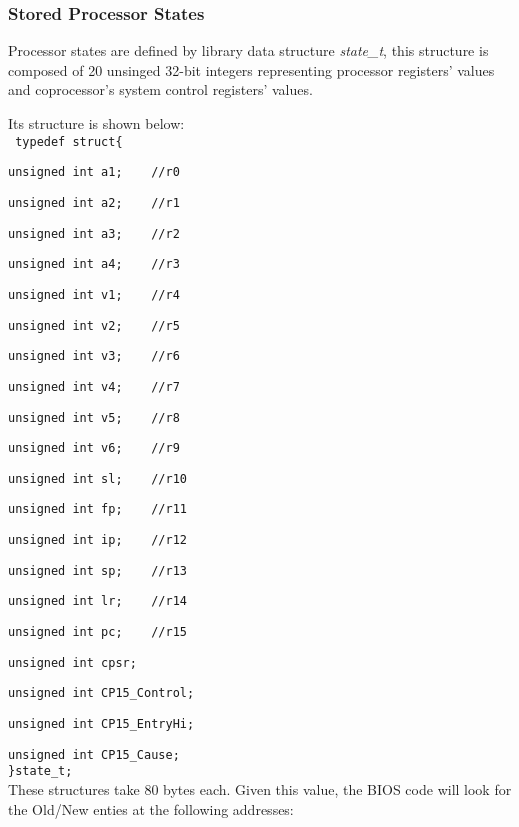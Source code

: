 \subsubsection{Stored Processor States}
Processor states are defined by library data structure \emph{state\_t}, this structure is composed of 20 unsinged 32-bit integers representing processor registers' values and coprocessor's system control registers' values. 

Its structure is shown below:
\nopagebreak
\\
\texttt{ typedef struct\{}

\nopagebreak
\texttt{unsigned int a1;\ \ \ \ //r0}

\nopagebreak
\texttt{unsigned int a2;\ \ \ \ //r1}

\nopagebreak
\texttt{unsigned int a3;\ \ \ \ //r2}

\nopagebreak
\texttt{unsigned int a4;\ \ \ \ //r3}

\nopagebreak
\texttt{unsigned int v1;\ \ \ \ //r4}

\nopagebreak
\texttt{unsigned int v2;\ \ \ \ //r5}

\nopagebreak
\texttt{unsigned int v3;\ \ \ \ //r6}

\nopagebreak
\texttt{unsigned int v4;\ \ \ \ //r7}

\nopagebreak
\texttt{unsigned int v5;\ \ \ \ //r8}

\nopagebreak
\texttt{unsigned int v6;\ \ \ \ //r9}

\nopagebreak
\texttt{unsigned int sl;\ \ \ \ //r10}

\nopagebreak
\texttt{unsigned int fp;\ \ \ \ //r11}

\nopagebreak
\texttt{unsigned int ip;\ \ \ \ //r12}

\nopagebreak
\texttt{unsigned int sp;\ \ \ \ //r13}

\nopagebreak
\texttt{unsigned int lr;\ \ \ \ //r14}

\nopagebreak
\texttt{unsigned int pc;\ \ \ \ //r15}

\nopagebreak
\texttt{unsigned int cpsr;}

\nopagebreak
\texttt{unsigned int CP15\_Control;}

\nopagebreak
\texttt{unsigned int CP15\_EntryHi;}

\nopagebreak
\texttt{unsigned int CP15\_Cause;}\\
\nopagebreak
\texttt{\}state\_t; }
\\

These structures take 80 bytes each. Given this value, the BIOS code will look for the Old/New enties at the following addresses:
\\

